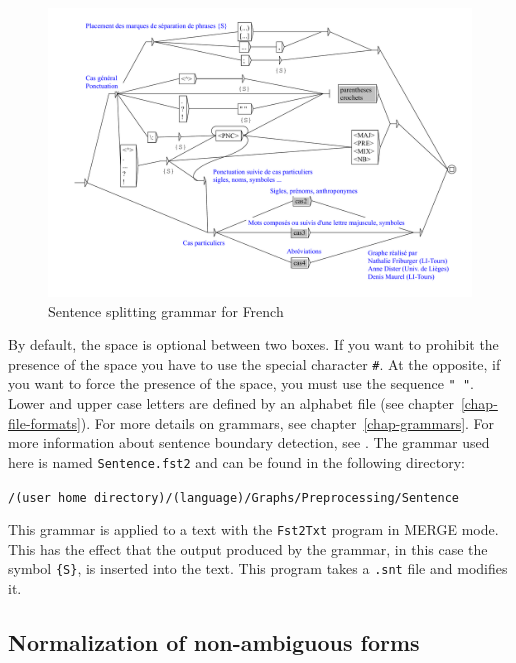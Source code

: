 \begin{figure}[!h]
\begin{center}
\includegraphics[width=15cm]{resources/img/fig2-10.pdf}
\caption{Sentence splitting grammar for
French\label{fig-example-sentence-splitting}}
\end{center}
\end{figure}

\bigskip
\noindent By default, the space is optional between two boxes. If you want to prohibit the
presence of the space you have to use the special character  \verb+#+. At the
opposite, if you want to force the presence of the space, you must use the
sequence \verb+" "+. Lower and upper case letters are defined by an alphabet
file (see chapter~\ref{chap-file-formats}). For
more details on grammars, see chapter~\ref{chap-grammars}.
For more information about sentence boundary detection, see
\cite{ameliorer-decoupage-en-phrases}. The grammar used here is named
\verb+Sentence.fst2+ and can be found in the following directory:

\bigskip
\verb+/(user home directory)/(language)/Graphs/Preprocessing/Sentence+

\bigskip
\noindent This grammar is applied to a text with the \verb+Fst2Txt+ program
 in
MERGE mode. This has the effect that the output produced
by the grammar, in this case the symbol \verb+{S}+, is inserted into
the text. This program takes a \verb+.snt+ file and modifies it.


\subsection{Normalization of non-ambiguous forms}

